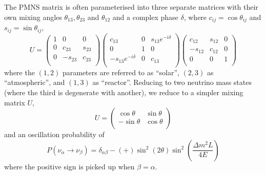 The PMNS matrix is often parameterised into three separate matrices with their own mixing angles $\theta_{13},\theta_{23}$ and $\theta_{12}$ and a complex phase $\delta$, where $c_{ij}=\cos\theta_{ij}$ and $s_{ij}=\sin\theta_{ij}$\cite{boris_mixing},
\begin{equation}
U = 
\begin{pmatrix}
1 & 0 & 0 \\
0 & c_{23} & s_{23} \\
0 & -s_{23} & c_{23} \\
\end{pmatrix}
\begin{pmatrix}
c_{13} & 0 & s_{13}e^{-i\delta} \\
0 & 1 & 0 \\
-s_{13}e^{-i\delta} & 0 & c_{13} \\
\end{pmatrix}
\begin{pmatrix}
c_{12} & s_{12} & 0 \\
-s_{12} & c_{12} & 0 \\
0 & 0 & 1 \\
\end{pmatrix}
\end{equation}
where the $(1,2)$ parameters are referred to as ``solar'', $(2,3)$ as ``atmospheric'', and $(1,3)$ as ``reactor''. Reducing to two neutrino mass states (where the third is degenerate with another), we reduce to a simpler mixing matrix $U$,
\begin{equation}
U = 
\begin{pmatrix}
\cos\theta & \sin\theta \\
- \sin\theta & \cos \theta \\
\end{pmatrix}
\end{equation}
and an oscillation probability of 
\begin{equation}
P(\nu_\alpha \rightarrow \nu_\beta) = \delta_{\alpha \beta} -(+) \sin^2 \left( 2\theta \right) \sin^2 \left( \frac{\Delta m^2 L}{4E} \right)
\end{equation}
where the positive sign is picked up when $\beta = \alpha$.

